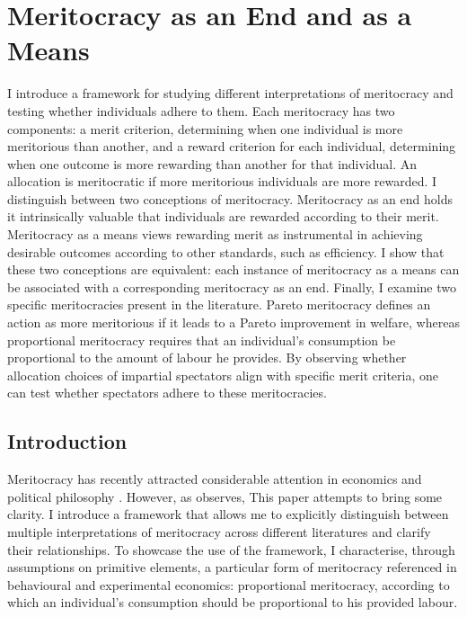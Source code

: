 \chapter{Meritocracy as an End and as a Means}\label{ch:meritocracy}

\begin{chapterabstract}
	I introduce a framework for studying different interpretations of meritocracy and testing whether individuals adhere to them. Each meritocracy has two components: a merit criterion, determining when one individual is more meritorious than another, and a reward criterion for each individual, determining when one outcome is more rewarding than another for that individual. An allocation is meritocratic if more meritorious individuals are more rewarded. I distinguish between two conceptions of meritocracy. Meritocracy as an end holds it intrinsically valuable that individuals are rewarded according to their merit. Meritocracy as a means views rewarding merit as instrumental in achieving desirable outcomes according to other standards, such as efficiency. I show that these two conceptions are equivalent: each instance of meritocracy as a means can be associated with a corresponding meritocracy as an end. Finally, I examine two specific meritocracies present in the literature. Pareto meritocracy defines an action as more meritorious if it leads to a Pareto improvement in welfare, whereas proportional meritocracy requires that an individual’s consumption be proportional to the amount of labour he provides. By observing whether allocation choices of impartial spectators align with specific merit criteria, one can test whether spectators adhere to these meritocracies.
\end{chapterabstract}

\section{Introduction}\label{sec:intromerit}

Meritocracy has recently attracted considerable attention in economics and political philosophy \citep{markovitsMeritocracyTrap2019,mulliganJusticeMeritocraticState2018,sandelTyrannyMeritWhat2020, tiroleMeritocracySocialJustice2022}. However, as \citet[p. 5]{senMeritJustice2000} observes,  This paper attempts to bring some clarity. I introduce a framework that allows me to explicitly distinguish between multiple interpretations of meritocracy across different literatures and clarify their relationships. To showcase the use of the framework, I characterise, through assumptions on primitive elements, a particular form of meritocracy referenced in behavioural and experimental economics: proportional meritocracy, according to which an individual's consumption should be proportional to his provided labour.

